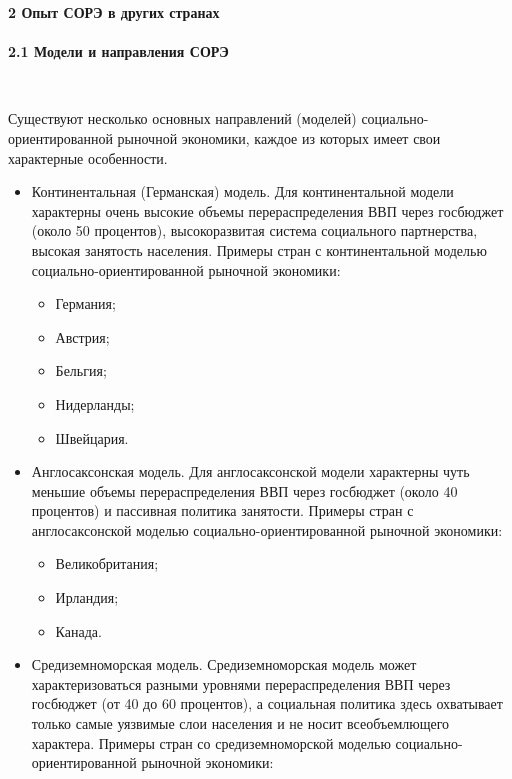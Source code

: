 \documentclass[14pt,a4paper]{article}
\begin{document}
    \newpage
    \begin{center}
        \textbf{2 Опыт СОРЭ в других странах}
        \\
        \HRule\\[0.5cm]
        \textbf{2.1 Модели и направления СОРЭ}
    \end{center}
    \\
    \par
    Существуют несколько основных направлений (моделей) социально-ориентированной рыночной
    экономики, каждое из которых имеет свои характерные особенности.
    \begin{itemize}
        \item Континентальная (Германская) модель.
        Для континентальной модели характерны очень высокие объемы перераспределения ВВП через
        госбюджет (около 50 процентов), высокоразвитая система социального партнерства, высокая занятость
        населения.
        Примеры стран с континентальной моделью социально-ориентированной рыночной экономики:
        \begin{itemize}
            \item Германия;
            \item Австрия;
            \item Бельгия;
            \item Нидерланды;
            \item Швейцария.
        \end{itemize}
        \item Англосаксонская модель.
        Для англосаксонской модели характерны чуть меньшие объемы перераспределения ВВП через
        госбюджет (около 40 процентов) и пассивная политика занятости.
        Примеры стран с англосаксонской моделью социально-ориентированной рыночной экономики:
        \begin{itemize}
            \item Великобритания;
            \item Ирландия;
            \item Канада.
        \end{itemize}
        \item Средиземноморская модель.
        Средиземноморская модель может характеризоваться разными уровнями перераспределения ВВП через
        госбюджет (от 40 до 60 процентов), а социальная политика здесь охватывает только самые уязвимые слои
        населения и не носит всеобъемлющего характера.
        Примеры стран со средиземноморской моделью социально-ориентированной рыночной экономики:

\end{itemize}
\end{document}

